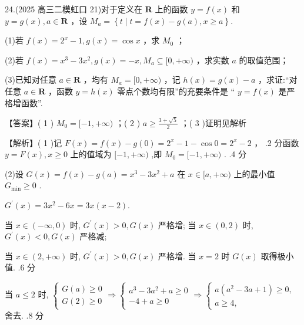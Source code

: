 \documentclass[10pt]{article}
\begin{document}
24.(2025 高三二模虹口 21)对于定义在 \(\mathbf{R}\) 上的函数 \(y = f\left( x\right)\) 和 \(y = g\left( x\right) ,a \in  \mathbf{R}\) ，设 \({M}_{a} = \left\{  {t \mid  t = f\left( x\right)  - g\left( a\right) ,x \geq  a}\right\}  .\)

(1)若 \(f\left( x\right)  = {2}^{x} - 1,g\left( x\right)  = \cos x\) ，求 \({M}_{0}\) ；

(2)若 \(f\left( x\right)  = {x}^{3} - 3{x}^{2},g\left( x\right)  =  - x,{M}_{a} \subseteq  \lbrack 0, + \infty )\) ，求实数 \(a\) 的取值范围；

(3)已知对任意 \(a \in  \mathbf{R}\) ，均有 \({M}_{a} = \lbrack 0, + \infty )\) ，记 \(h\left( x\right)  = g\left( x\right)  - a\) ，求证:“对任意 \(a \in  \mathbf{R}\) ，函数 \(y = h\left( x\right)\) 零点个数均有限”的充要条件是 “ \(y = f\left( x\right)\) 是严格增函数”.

【答案】( 1 ) \({M}_{0} = \lbrack  - 1, + \infty )\) ；( 2 ) \(a \geq  \frac{3 + \sqrt{5}}{2}\) ；( 3 )证明见解析

【解析】( 1 )记 \(F\left( x\right)  = f\left( x\right)  - g\left( 0\right)  = {2}^{x} - 1 - \cos 0 = {2}^{x} - 2\) ， .2 分函数 \(y = F\left( x\right) ,x \geq  0\) 上的值域为 \(\lbrack  - 1, + \infty )\) ,即 \({M}_{0} = \lbrack  - 1, + \infty )\) . .4 分

(2)设 \(G\left( x\right)  = f\left( x\right)  - g\left( a\right)  = {x}^{3} - 3{x}^{2} + a\) 在 \(x \in  \lbrack a, + \infty )\) 上的最小值 \({G}_{\min } \geq  0\) .

\({G}^{\prime }\left( x\right)  = 3{x}^{2} - {6x} = {3x}\left( {x - 2}\right) .\)

当 \(x \in  \left( {-\infty ,0}\right)\) 时, \({G}^{\prime }\left( x\right)  > 0,G\left( x\right)\) 严格增; 当 \(x \in  \left( {0,2}\right)\) 时, \({G}^{\prime }\left( x\right)  < 0,G\left( x\right)\) 严格减;

当 \(x \in  \left( {2, + \infty }\right)\) 时, \({G}^{\prime }\left( x\right)  > 0,G\left( x\right)\) 严格增. 当 \(x = 2\) 时 \(G\left( x\right)\) 取得极小值. .6 分

当 \(a \leq  2\) 时, \(\left\{  {\begin{array}{l} G\left( a\right)  \geq  0 \\  G\left( 2\right)  \geq  0 \end{array} \Rightarrow  \left\{  {\begin{array}{l} {a}^{3} - 3{a}^{2} + a \geq  0 \\   - 4 + a \geq  0 \end{array} \Rightarrow  \left\{  \begin{array}{l} a\left( {{a}^{2} - {3a} + 1}\right)  \geq  0, \\  a \geq  4, \end{array}\right. }\right. }\right.\) 舍去. .8 分
\end{document}
